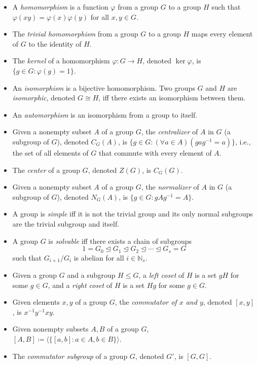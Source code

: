 \documentclass{article}
\newcommand{\N}{\mathbb{N}}
\newcommand{\gen}[1]{\langle #1\rangle}
\newcommand{\normaleq}{\trianglelefteq}
\begin{document}
\begin{itemize}
\item A \emph{homomorphism} is a function $\varphi$ from a group $G$ to a group $H$ such that $\varphi(xy) = \varphi(x)\varphi(y)$ for all $x,y\in G$.
\item The \emph{trivial homomorphism} from a group $G$ to a group $H$ maps every element of $G$ to the identity of $H$.
\item The \emph{kernel} of a homomorphism $\varphi\colon G\to H$, denoted $\ker\varphi$, is $\{g\in G : \varphi(g) = 1\}$.
\item An \emph{isomorphism} is a bijective homomorphism.  Two groups $G$ and $H$ are \emph{isomorphic}, denoted $G\cong H$, iff there exists an isomorphism between them.
\item An \emph{automorphism} is an isomorphism from a group to itself.

\item Given a nonempty subset $A$ of a group $G$, the \emph{centralizer} of $A$ in $G$ (a subgroup of $G$), denoted $C_G(A)$, is $\{g\in G : (\forall a\in A)(gag^{-1} = a)\}$, i.e., the set of all elements of $G$ that commute with every element of $A$.
\item The \emph{center} of a group $G$, denoted $Z(G)$, is $C_G(G)$.
\item Given a nonempty subset $A$ of a group $G$, the \emph{normalizer} of $A$ in $G$ (a subgroup of $G$), denoted $N_G(A)$, is $\{g\in G : gAg^{-1} = A\}$.
\item A group is \emph{simple} iff it is not the trivial group and its only normal subgroups are the trivial subgroup and itself.
\item A group $G$ is \emph{solvable} iff there exists a chain of subgroups $$1 = G_0\normaleq G_1\normaleq G_2\normaleq\cdots\normaleq G_s = G$$ such that $G_{i+1}/G_i$ is abelian for all $i\in\N_s$.
\item Given a group $G$ and a subgroup $H\leq G$, a \emph{left coset} of $H$ is a set $gH$ for some $g\in G$, and a \emph{right coset} of $H$ is a set $Hg$ for some $g\in G$.

\item Given elements $x,y$ of a group $G$, the \emph{commutator of $x$ and $y$}, denoted $[x,y]$, is $x^{-1}y^{-1}xy$.
\item Given nonempty subsets $A,B$ of a group $G$, $[A,B] \coloneqq \gen{\{[a,b] : a\in A, b\in B\}}$.
\item The \emph{commutator subgroup} of a group $G$, denoted $G'$, is $[G,G]$.


\end{itemize}
\end{document}
